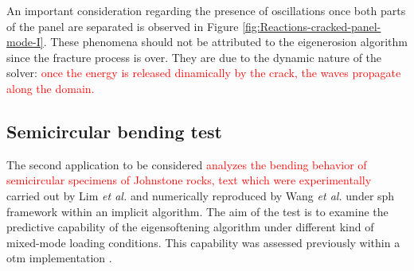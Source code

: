 \documentclass[preprint,12pt,a4paper]{elsarticle}
\newcommand{\PNA}[1]{
  \textcolor{red}{{#1}}
}
\begin{document}
An important consideration regarding the presence of oscillations once
both parts of the panel are separated is observed in Figure
\ref{fig:Reactions-cracked-panel-mode-I}. These phenomena should not be
attributed to the eigenerosion algorithm since the fracture process is
over. They are due to the dynamic nature of the solver: \PNA{once the
  energy is released dinamically by the crack, the waves propagate
  along the domain.}


\subsection{Semicircular bending test}
\label{sec:3.2}

The second application to be considered \PNA{analyzes the bending behavior of semicircular specimens of Johnstone rocks, text which were experimentally} carried out by Lim {\it et
  al.} \cite{LIM_1993} and numerically reproduced by Wang {\it et
  al.}\cite{Wang_2020} under \acrshort{sph} framework within an
implicit algorithm. The aim of the test is to examine the predictive
capability of the eigensoftening algorithm under different kind of
mixed-mode loading conditions. This capability was assessed previously within a
\acrshort{otm} implementation \cite{Navas_2018_ES}.
\end{document}
